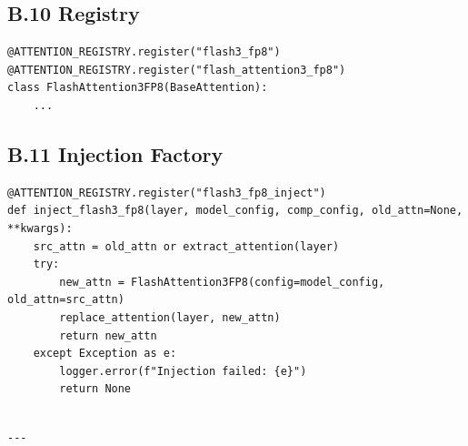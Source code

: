 \subsection{B.10 Registry}

\begin{lstlisting}
@ATTENTION_REGISTRY.register("flash3_fp8")
@ATTENTION_REGISTRY.register("flash_attention3_fp8")
class FlashAttention3FP8(BaseAttention):
    ...
\end{lstlisting}

\subsection{B.11 Injection Factory}

\begin{lstlisting}
@ATTENTION_REGISTRY.register("flash3_fp8_inject")
def inject_flash3_fp8(layer, model_config, comp_config, old_attn=None, **kwargs):
    src_attn = old_attn or extract_attention(layer)
    try:
        new_attn = FlashAttention3FP8(config=model_config, old_attn=src_attn)
        replace_attention(layer, new_attn)
        return new_attn
    except Exception as e:
        logger.error(f"Injection failed: {e}")
        return None
\end{lstlisting}
\begin{lstlisting}

---
\end{lstlisting}